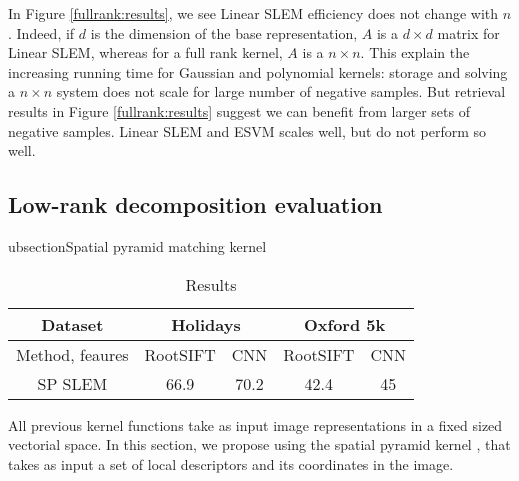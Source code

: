 In Figure \ref{fullrank:results}, we see Linear SLEM efficiency does not change with $n$. 
Indeed, if $d$ is the dimension of the base representation, $A$ is a $d\times d$ matrix for Linear SLEM, whereas for a full rank kernel, $A$ is a $n\times n$. 
This explain the increasing running time for Gaussian and polynomial kernels: storage and solving a $n\times n$ system does not scale for large number of negative samples. 
But retrieval results in Figure \ref{fullrank:results} suggest we can benefit from larger sets of negative samples. Linear SLEM and ESVM scales well, but do not perform so well. 
\vspace{3 mm}


\subsection{Low-rank decomposition evaluation}



ubsection{Spatial pyramid matching kernel}

\begin{table}[!h]
    \centering
    \begin{tabular}{|c|c|c|c|c|}
    \hline
    Dataset & \multicolumn{2}{|c|}{\textbf{Holidays}} & \multicolumn{2}{|c|}{\textbf{Oxford 5k}}\\
    \hline
        Method, feaures & RootSIFT & CNN & RootSIFT
        &CNN \\
    \hline
    \hline
        SP SLEM & 66.9 & 70.2 & 42.4 & 45 \\
    \hline
    \end{tabular}
    \caption{Results }
    \label{tab:spk}
\end{table}
All previous kernel functions take as input image representations in a fixed sized vectorial space. In this section, we propose using the spatial pyramid kernel \cite{GrauDa05}, that takes as input a set of local descriptors and its coordinates in the image.

